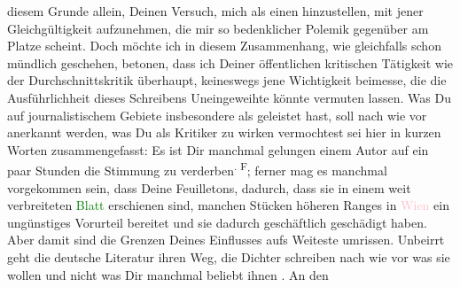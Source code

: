               diesem Grunde allein, Deinen Versuch, mich als einen \label{K_L03521-9v}\label{K_L03521-9h} hinzustellen, mit jener Gleichgültigkeit aufzunehmen, die mir so bedenklicher
               Polemik gegenüber am Platze scheint. Doch möchte ich in diesem Zusammenhang, wie
               gleichfalls schon mündlich geschehen, betonen, dass ich Deiner öffentlichen
               kritischen Tätigkeit wie der Durchschnittskritik überhaupt, keineswegs jene
               Wichtigkeit beimesse, die die Ausführlichheit dieses Schreibens Uneingeweihte könnte
               vermuten lassen. Was Du auf journalistischem Gebiete insbesondere als \label{K_L03521-10v}\label{K_L03521-10h} geleistet hast, soll nach
               wie vor anerkannt werden, was Du als Kritiker zu wirken vermochtest sei hier in
               kurzen Worten zusammengefasst: Es ist Dir manchmal gelungen einem Autor auf ein paar
               Stunden die Stimmung zu verderben\substVorne{}\textsuperscript{. F}\substDazwischen{}; f\substHinten{}erner mag es manchmal vorgekommen sein, dass Deine Feuilletons, dadurch, dass
               sie in einem weit verbreiteten \textcolor{green}{Blatt}{}\ledrightnote{{$\rightarrow$}\textcolor{green}{Neue Freie Presse}} erschienen sind, manchen Stücken höheren Ranges in \textcolor{pink}{Wien}{}\ledrightnote{\textcolor{pink}{Wien}} ein ungünstiges Vorurteil bereitet und sie dadurch
               geschäftlich geschädigt haben. Aber {\pb}damit sind die Grenzen Deines Einflusses aufs Weiteste umrissen. Unbeirrt geht die
               deutsche Literatur ihren Weg, die Dichter schreiben nach wie vor was sie wollen und
               nicht was Dir manchmal beliebt ihnen \label{K_L03521-11v}\label{K_L03521-11h}. An den
